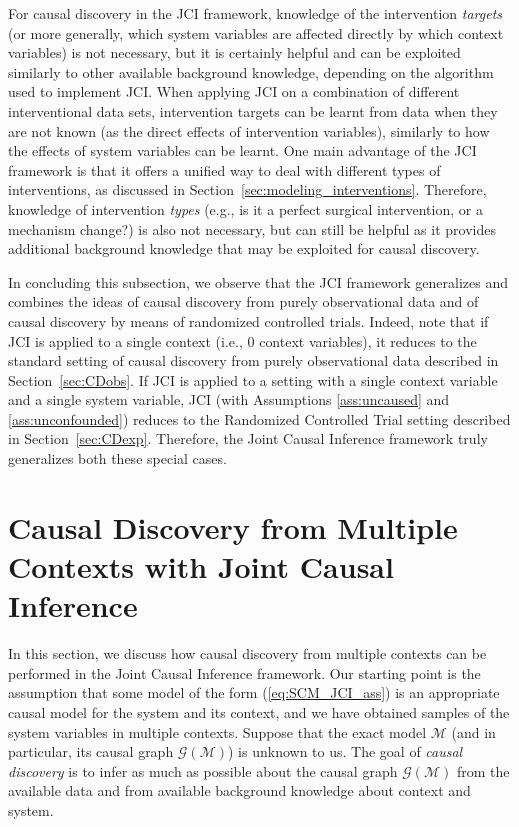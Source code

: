 \documentclass[twoside,11pt]{article}
\newcommand\C[1]{\mathcal{#1}}
\newcommand\eref[1]{(\ref{#1})}
\newcommand{\Joris}[1]{{\color{blue}#1}}
\newcommand{\Sara}[1]{{\color{purple}#1}}
\begin{document}
For causal discovery in the JCI framework, knowledge of the intervention \emph{targets} (or more generally, which system variables are affected directly by which context variables) is not necessary, but it is certainly helpful and can be exploited similarly to other available background knowledge, depending on the algorithm used to implement JCI. When applying JCI on a combination of different interventional data sets, intervention targets can be learnt from data when they are not known (as the direct effects of intervention variables), similarly to how the effects of system variables can be learnt. 
One main advantage of the JCI framework is that it offers a unified way to deal with different types of interventions,
as discussed in Section~\ref{sec:modeling_interventions}. Therefore, knowledge of intervention \emph{types} (e.g., is it a perfect surgical intervention, or a mechanism change?) is also not necessary, but can still be helpful as it provides additional background knowledge that may be exploited for causal discovery. 

In concluding this subsection, we observe that the JCI framework 
generalizes and combines the ideas of causal discovery from purely observational
data and of causal discovery by means of randomized controlled trials. Indeed,
note that if JCI is applied to a single context (i.e., 0 context variables), 
it reduces to the standard setting of causal discovery from purely observational data
described in Section~\ref{sec:CDobs}. 
If JCI is applied to a setting with a single context variable and a single system variable, 
JCI (with Assumptions \ref{ass:uncaused} and \ref{ass:unconfounded}) reduces to the Randomized
Controlled Trial setting described in Section~\ref{sec:CDexp}. Therefore, the Joint Causal Inference framework 
truly generalizes both these special cases.

\section{Causal Discovery from Multiple Contexts with Joint Causal Inference}\label{sec:causal_discovery}

In this section, we discuss how causal discovery from multiple contexts
can be performed in the Joint Causal Inference framework.
Our starting point is the assumption that some model of the form \eref{eq:SCM_JCI_ass}
is an appropriate causal model for the system and its context, and we have 
obtained samples of the system variables in multiple contexts.
Suppose that the exact model $\C{M}$ (and in particular, its causal graph
$\C{G}(\C{M})$) is unknown to us. The goal of \emph{causal
discovery} is to infer as much as possible about the causal graph $\C{G}(\C{M})$
from the available data and from available background knowledge about context and system.
\end{document}
